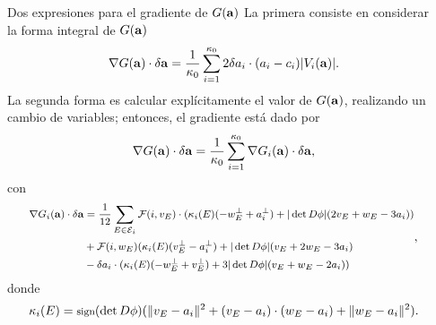 \documentclass[final]{beamer}
\newcommand{\bsi}{{\bf a}}
\newcommand{\E}{\mathcal{E}}
\newcommand{\F}{\mathcal{F}}
\newlength{\sepwidth}
\newlength{\colwidth}
\newcommand{\separatorcolumn}{\begin{column}{\sepwidth}\end{column}}
\begin{document}
\begin{frame}[t]
\begin{columns}[t]
\begin{column}{\colwidth}
\begin{alertblock}{Dos expresiones para el gradiente de $G(\bsi)$}
La primera consiste en considerar la forma integral de $G(\bsi)$
\begin{equation}
    \footnotesize \nabla G(\bsi)\cdot \delta \bsi = \frac{1}{\kappa_0}\sum^{\kappa_0}_{i=1} 2 \delta a_i \cdot (a_i - c_i)|V_i(\bsi)|. \label{grad1}
\end{equation} 
La segunda forma es calcular explícitamente el valor de $G(\bsi)$, realizando un cambio de variables; entonces, el gradiente está dado por
\begin{equation}\label{grad2}
\footnotesize \nabla G(\bsi) \cdot \delta \bsi = \frac{1}{\kappa_0}\sum^{\kappa_0}_{i=1}\nabla G_i(\bsi)\cdot \delta \bsi,
\end{equation}
con
\begin{align}
\footnotesize\begin{split}
     \nabla G_i(\bsi)\cdot \delta \bsi &= \frac{1}{12}\sum_{E\in \E_i}\F(i,v_E)\cdot(\kappa_i(E)(-w^\perp_E + a^\perp_i) + |\det D\phi|(2v_E+w_E-3a_i)) \\
    & +\F(i,w_E)(\kappa_i(E)(v^\perp_E-a^\perp_i)+|\det D\phi|(v_E+2w_E-3a_i)\\
    &-\delta a_i \cdot (\kappa_i(E)(-w_E^\perp+v^\perp_E)+3|\det D\phi|(v_E+w_E-2a_i) )\end{split}, \label{grad2}
\end{align}
donde 
\begin{equation*}
    \footnotesize \kappa_i(E)=\text{sign}(\det D\phi)(\|v_E-a_i\|^2+(v_E-a_i)\cdot(w_E-a_i)+\|w_E-a_i\|^2).
\end{equation*}
\end{alertblock}
\end{column}

\separatorcolumn


\end{columns}
\end{frame}
\end{document}
